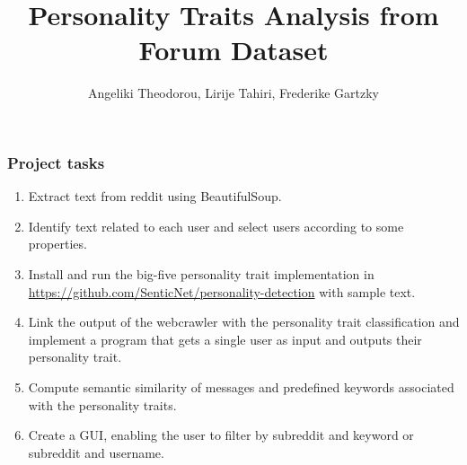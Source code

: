 \documentclass{beamer}
\title{Personality Traits Analysis from Forum Dataset}
\author{Angeliki Theodorou, Lirije Tahiri, Frederike Gartzky}
\begin{document}
	\frame{\titlepage}
	
	\begin{frame}
		\frametitle{Project tasks}
		\begin{enumerate}
			\item Extract text from reddit using BeautifulSoup.%
			\item Identify text related to each user and select users according to some properties.
			\item Install and run the big-five personality trait implementation in \href{url}{https://github.com/SenticNet/personality-detection} with sample text.
			\item Link the output of the webcrawler with the personality trait classification and implement a program that gets a single user as input and outputs their personality trait.
			\item Compute semantic similarity of messages and predefined keywords associated with the personality traits.
			\item Create a GUI, enabling the user to filter by subreddit and keyword or subreddit and username.
		\end{enumerate}
	\end{frame}
	
\end{document}

